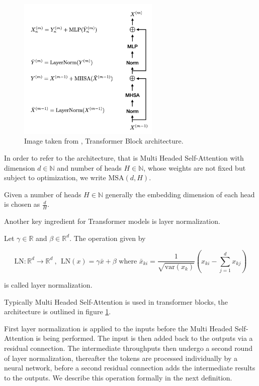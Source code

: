 \begin{figure}[h!]
    \includegraphics[width=0.6\textwidth]{models/preliminaries/imgs/transformer-block.png}
    \caption{Image taken from \cite{turnerIntroductionTransformers2024}, Transformer Block architecture.}
    \label{fig:transformer_block}
\end{figure}

In order to refer to the architecture,
that is Multi Headed Self-Attention with dimension $d \in \mathbb N$ and number of heads $H \in \mathbb N$,
whose weights are not fixed but subject to optimization, 
we write $\text{MSA}(d, H)$.

Given a number of heads $H \in \mathbb N$ generally the embedding dimension of each head is chosen as $\frac{d}{H}$.

Another key ingredient for Transformer models is layer normalization.

\begin{definition}
    Let $\gamma \in \mathbb R$ and $\beta \in \mathbb R^d$. The operation given by

        $$\text{LN} : \mathbb R^d \to \mathbb R^d ~, ~~ 
        \text{LN}(x) = \gamma \bar{x} + \beta 
        \text{ where } \bar{x}_{ki} = \frac{1}{\sqrt{\text{var}(x_{k})}} (x_{ki} - \sum_{j=1}^d x_{kj})$$

    is called layer normalization.
\end{definition}

Typically Multi Headed Self-Attention is used in transformer blocks,
the architecture is outlined in figure \ref{fig:transformer_block}.

First layer normalization is applied to the inputs before the Multi Headed Self-Attention is being performed.
The input is then added back to the outputs via a residual connection.
The intermediate throughputs then undergo a second round of layer normalization, 
thereafter the tokens are processed individually by a neural network,
before a second residual connection adds the intermediate results to the outputs.
We describe this operation formally in the next definition.

